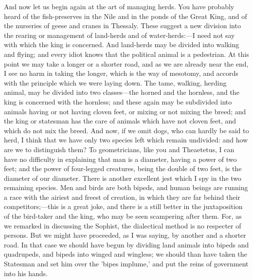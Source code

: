 \documentclass[11pt,letter]{article}
\begin{document}
\par  And now let us begin again at the art of managing herds. You have probably heard of the fish-preserves in the Nile and in the ponds of the Great King, and of the nurseries of geese and cranes in Thessaly. These suggest a new division into the rearing or management of land-herds and of water-herds:—I need not say with which the king is concerned. And land-herds may be divided into walking and flying; and every idiot knows that the political animal is a pedestrian. At this point we may take a longer or a shorter road, and as we are already near the end, I see no harm in taking the longer, which is the way of mesotomy, and accords with the principle which we were laying down. The tame, walking, herding animal, may be divided into two classes—the horned and the hornless, and the king is concerned with the hornless; and these again may be subdivided into animals having or not having cloven feet, or mixing or not mixing the breed; and the king or statesman has the care of animals which have not cloven feet, and which do not mix the breed. And now, if we omit dogs, who can hardly be said to herd, I think that we have only two species left which remain undivided: and how are we to distinguish them? To geometricians, like you and Theaetetus, I can have no difficulty in explaining that man is a diameter, having a power of two feet; and the power of four-legged creatures, being the double of two feet, is the diameter of our diameter. There is another excellent jest which I spy in the two remaining species. Men and birds are both bipeds, and human beings are running a race with the airiest and freest of creation, in which they are far behind their competitors;—this is a great joke, and there is a still better in the juxtaposition of the bird-taker and the king, who may be seen scampering after them. For, as we remarked in discussing the Sophist, the dialectical method is no respecter of persons. But we might have proceeded, as I was saying, by another and a shorter road. In that case we should have begun by dividing land animals into bipeds and quadrupeds, and bipeds into winged and wingless; we should than have taken the Statesman and set him over the 'bipes implume,' and put the reins of government into his hands.
\end{document}
